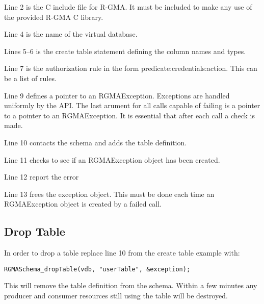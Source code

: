 Line 2 is the C include file for R-GMA. It must be included
to make any use of the provided R-GMA C library.

Line 4 is the name of the virtual database.

Lines 5--6 is the create table statement defining the column names and
types.

Line 7 is the authorization rule in the form
predicate:credentials:action. This can be a list of rules.

Line 9 defines a pointer to an RGMAException. Exceptions are handled uniformly
by the API. The last arument for all calls capable of failing is a pointer to a
pointer to an RGMAException.  It is essential that after each call a check is made. 

Line 10 contacts the schema and adds the table definition.

Line 11 checks to see if an RGMAException object has been created.

Line 12 report the error

Line 13 frees the exception object. This must be done each time an
RGMAException object is created by a failed call.



\subsection {Drop Table}
\label{sec:dropTable}
In order to drop a table replace line 10 from the create table example
with:
\begin{verbatim}
RGMASchema_dropTable(vdb, "userTable", &exception);
\end{verbatim}
This will remove the table definition from the schema. Within a few
minutes any producer and consumer resources still using the table will
be destroyed.